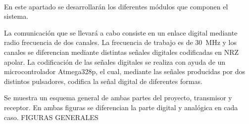 \paragraph{}
En este apartado se desarrollar\'an los diferentes módulos que componen el sistema.

La comunicaci\'on que se llevará a cabo consiste en un enlace digital mediante radio frecuencia de dos canales.
La frecuencia de trabajo es de \SI{30}{\mega\hertz} y los canales se diferencian mediante distintas señales digitales codificadas en NRZ apolar.
La codificación de las señales digitales se realiza con ayuda de un microcontrolador Atmega328p, el cual, mediante las señales producidas por dos distintos pulsadores, codifica la señal digital de diferentes formas.

Se muestra un esquema general de ambas partes del proyecto, transmisor y receptor. En ambas figuras se diferencian la parte digital y anal\'ogica en cada caso.
FIGURAS GENERALES
